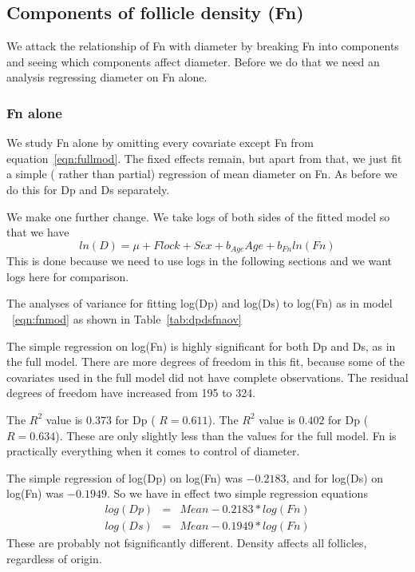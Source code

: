 \documentclass[titlepage]{article}  %
\begin{document}
\subsection{Components of follicle density (Fn)}
We attack the relationship of Fn with diameter by breaking Fn into components and seeing which components affect diameter. Before we do that we need an analysis regressing diameter on Fn alone.

\subsubsection{Fn alone}
We study Fn alone by omitting every covariate except Fn from equation~\ref{eqn:fullmod}. The fixed effects remain, but apart from that, we just fit a simple ( rather than partial) regression of mean diameter on Fn. As before we do this for Dp and Ds separately. 

We make one further change. We take logs of both sides of the fitted model so that we have
\begin{equation}
\label{eqn:lnd}
ln(D) = \mu + Flock + Sex + b_{Age} Age + b_{Fn} ln(Fn)
\end{equation}
This is done because we need to use logs in the following sections and we want logs here for comparison.

The analyses of variance for fitting log(Dp) and log(Ds) to log(Fn) as in model ~\ref{eqn:fnmod} as shown in Table~\ref{tab:dpdsfnaov}

The  simple regression on log(Fn) is highly significant for both Dp and Ds, as in the full model. There are more degrees of freedom in this fit, because some of the covariates used in the full model did not have complete observations. The residual degrees of freedom have increased from 195 to 324. 

The $R^{2}$ value is $0.373$ for Dp ( $R = 0.611$). The $R^{2}$ value is $0.402$ for Dp ( $R = 0.634$). These are only slightly less than the values for the full model. Fn is practically everything when it comes to control of diameter.

The simple regression of log(Dp) on log(Fn) was $-0.2183$, and for log(Ds) on log(Fn) was $-0.1949$. So we have in effect two simple regression equations
\begin{eqnarray}
log(Dp) & = & Mean - 0.2183 * log(Fn) \\
log(Ds) & = & Mean - 0.1949 * log(Fn) 
\end{eqnarray}
These are probably not fsignificantly different. Density affects all follicles, regardless of origin.
\end{document}
